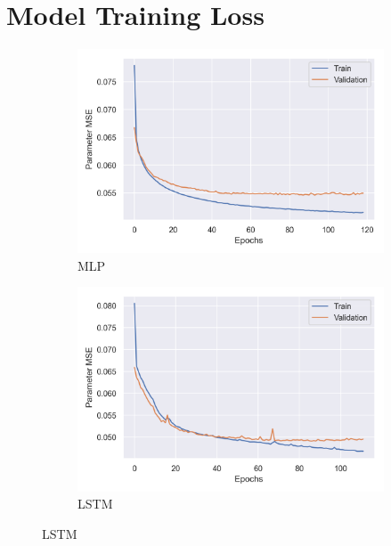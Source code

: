 \chapter{Model Training Loss}
\label{appendix:training-loss}

\begin{figure}[ht]
    \centering
    \begin{subfigure}[b]{0.45\textwidth}
        \centering
        \includegraphics[width=\textwidth]{figures/inverse-synth/loss-plots/mlp-mfcc.png}
        \caption{MLP}
    \end{subfigure}
    \begin{subfigure}[b]{0.45\textwidth}
        \centering
        \includegraphics[width=\textwidth]{figures/inverse-synth/loss-plots/lstm-optuna-mfcc.png}
        \caption{LSTM}
    \end{subfigure}
    

\end{figure}
